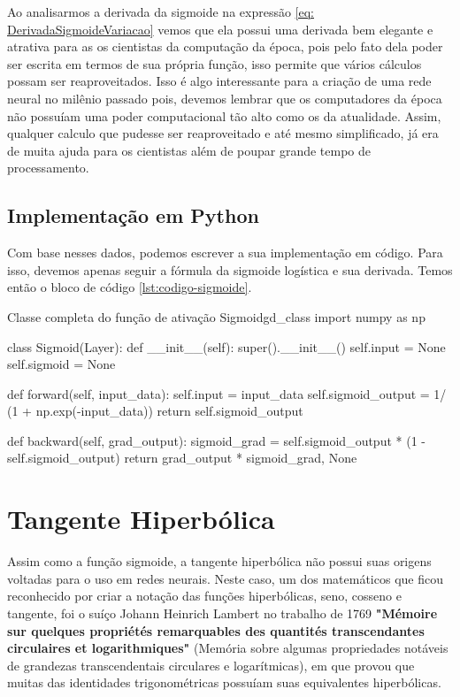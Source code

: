 Ao analisarmos a derivada da sigmoide na expressão \ref{eq: DerivadaSigmoideVariacao} vemos que ela possui uma derivada bem elegante e atrativa para as os cientistas da computação da época, pois pelo fato dela poder ser escrita em termos de sua própria função, isso permite que vários cálculos possam ser reaproveitados. Isso é algo interessante para a criação de uma rede neural no milênio passado pois, devemos lembrar que os computadores da época não possuíam uma poder computacional tão alto como os da atualidade. Assim, qualquer calculo que pudesse ser reaproveitado e até mesmo simplificado, já era de muita ajuda para os cientistas além de poupar grande tempo de processamento.

\subsection{Implementação em Python}

Com base nesses dados, podemos escrever a sua implementação em código. Para isso, devemos apenas seguir a fórmula da sigmoide logística e sua derivada. Temos então o bloco de código \ref{lst:codigo-sigmoide}.

\begin{codelisting}{Classe completa do função de ativação Sigmoid}{gd_class}
import numpy as np

class Sigmoid(Layer):
    def __init__(self):
        super().__init__()
        self.input = None
        self.sigmoid = None

    def forward(self, input_data):
        self.input = input_data
        self.sigmoid_output = 1/ (1 + np.exp(-input_data))
        return self.sigmoid_output

    def backward(self, grad_output):
        sigmoid_grad = self.sigmoid_output * (1 - self.sigmoid_output)
        return grad_output * sigmoid_grad, None
\end{codelisting}

\section{Tangente Hiperbólica}

Assim como a função sigmoide, a tangente hiperbólica não possui suas origens voltadas para o uso em redes neurais. Neste caso, um dos matemáticos que ficou reconhecido por criar a notação das funções hiperbólicas, seno, cosseno e tangente, foi o suíço Johann Heinrich Lambert no trabalho de 1769 \textbf{"Mémoire sur quelques propriétés remarquables des quantités transcendantes circulaires et logarithmiques"} (Memória sobre algumas propriedades notáveis de grandezas transcendentais circulares e logarítmicas), em que provou que muitas das identidades trigonométricas possuíam suas equivalentes hiperbólicas.

